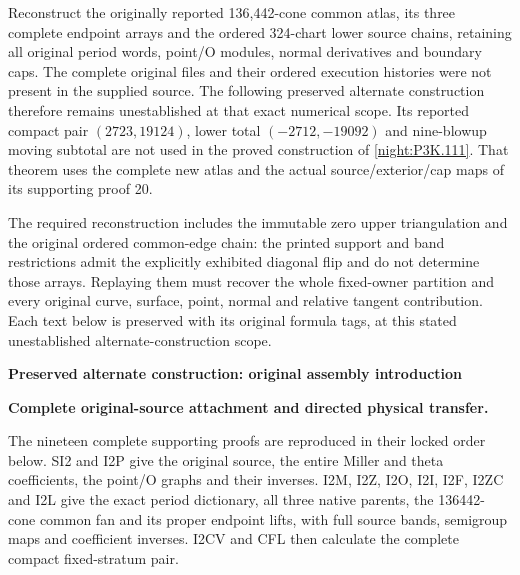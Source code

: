 \begin{problem}
\label{iv:open:K111:original_auxiliary_arrays}
Reconstruct the originally reported 136,442-cone common atlas, its
three complete endpoint arrays and the ordered 324-chart lower source
chains, retaining all original period words, point/O modules, normal
derivatives and boundary caps.  The complete original files and their
ordered execution histories were not present in the supplied source.
The following preserved alternate construction therefore remains
unestablished at that exact numerical scope.  Its reported compact
pair $(2723,19124)$, lower total $(-2712,-19092)$ and nine-blowup
moving subtotal are not used in the proved construction of
\cref{night:P3K.111}.  That theorem uses the complete new atlas and
the actual source/exterior/cap maps of its supporting proof 20.

The required reconstruction includes the immutable zero upper
triangulation and the original ordered common-edge chain: the printed
support and band restrictions admit the explicitly exhibited diagonal
flip and do not determine those arrays.  Replaying them must recover
the whole fixed-owner partition and every original curve, surface,
point, normal and relative tangent contribution.  Each text below is
preserved with its original formula tags, at this stated unestablished
alternate-construction scope.
\end{problem}


\par\bigskip\noindent\textbf{Preserved alternate construction: original assembly introduction}\par
\noindent\textbf{Complete original-source attachment and directed physical transfer.}\par\smallskip

The nineteen complete supporting proofs are reproduced in their locked
order below. SI2 and I2P give the original source, the entire Miller and
theta coefficients, the point/O graphs and their inverses. I2M, I2Z,
I2O, I2I, I2F, I2ZC and I2L give the exact period dictionary, all three
native parents, the 136442-cone common fan and its proper endpoint lifts,
with full source bands, semigroup maps and coefficient inverses.
I2CV and CFL then calculate the complete compact fixed-stratum pair.


